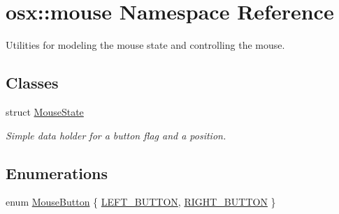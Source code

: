 \hypertarget{namespaceosx_1_1mouse}{\section{osx\-:\-:mouse Namespace Reference}
\label{namespaceosx_1_1mouse}
}


Utilities for modeling the mouse state and controlling the mouse.  


\subsection*{Classes}
\begin{DoxyCompactItemize}
\item 
struct \hyperlink{structosx_1_1mouse_1_1_mouse_state}{Mouse\-State}
\begin{DoxyCompactList}\small\item\em Simple data holder for a button flag and a position. \end{DoxyCompactList}\end{DoxyCompactItemize}
\subsection*{Enumerations}
\begin{DoxyCompactItemize}
\item 
enum \hyperlink{namespaceosx_1_1mouse_a025e93cf6af5808e4c8c2525fc668499}{Mouse\-Button} \{ \hyperlink{namespaceosx_1_1mouse_a025e93cf6af5808e4c8c2525fc668499aba5b540b1c997fb283ad354d66d6b5c8}{L\-E\-F\-T\-\_\-\-B\-U\-T\-T\-O\-N}, 
\hyperlink{namespaceosx_1_1mouse_a025e93cf6af5808e4c8c2525fc668499a8f8087d9c68a22fe0ab65e0995e6649b}{R\-I\-G\-H\-T\-\_\-\-B\-U\-T\-T\-O\-N}
 \}
\end{DoxyCompactItemize}
